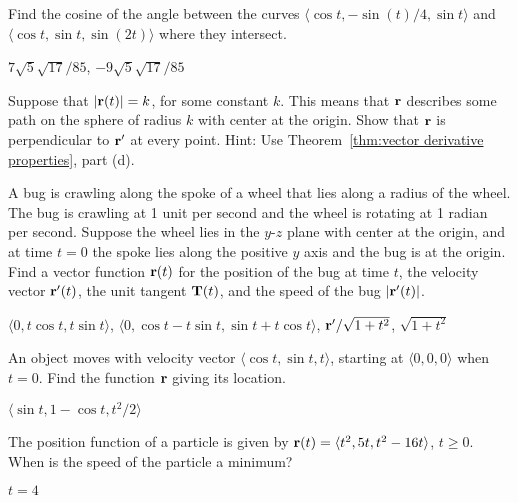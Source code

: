 \begin{enumialphparenastyle}
\begin{ex}
Find the cosine of the angle between the curves $\langle
\cos t,-\sin(t)/4,\sin t\rangle$ and $\langle \cos t,\sin t, \sin(2t)\rangle$
where they intersect.
\begin{sol} $7\sqrt{5}\sqrt{17}/85$, $-9\sqrt{5}\sqrt{17}/85$
\end{sol}
\end{ex}

\begin{ex}\label{ex:derivative is perpendicular}
Suppose that $|{\bf r}(t)|=k$, for some constant $k$. This
means that $\bf r$ describes some path on the sphere of radius $k$
with center at the origin. Show that $\bf r$ is perpendicular to ${\bf
  r}'$ at every point. Hint: Use Theorem~\ref{thm:vector derivative properties}, part (d).
\end{ex}

\begin{ex}
A bug is crawling along the spoke of a wheel that lies along
a radius of the wheel. The bug is crawling at 1 unit per second and
the wheel is rotating at 1 radian per second. Suppose the wheel lies
in the $y$-$z$ plane with center at the origin, and at time $t=0$ the
spoke lies along the positive $y$ axis and the bug is at the origin. 
Find a vector function ${\bf r}(t)$
for the position of the bug at time $t$, the velocity vector
${\bf r}'(t)$, the unit tangent ${\bf T}(t)$, and the speed of the bug
$|{\bf r}'(t)|$.
\begin{sol} $\langle 0,t\cos t,t\sin t\rangle$, 
$\langle 0,\cos t-t\sin t,\sin t+t\cos t\rangle$,
${\bf r}'/\sqrt{1+t^2}$, $\sqrt{1+t^2}$
\end{sol}
\end{ex}

\begin{ex}
An object moves with velocity vector $\langle \cos t, \sin t,
t\rangle$, starting at $\langle 0,0,0\rangle$ when $t=0$. Find the function
${\bf r}$ giving its location.
\begin{sol} $\langle \sin t,1-\cos t,t^2/2\rangle$
\end{sol}
\end{ex}

\begin{ex}
The position function of a particle is given by ${\bf r}(t) =
\langle t^2,5t,t^2-16t\rangle$, $t\geq 0$.  When is the speed of the particle
a minimum?
\begin{sol} $t=4$
\end{sol}
\end{ex}


\end{enumialphparenastyle}
